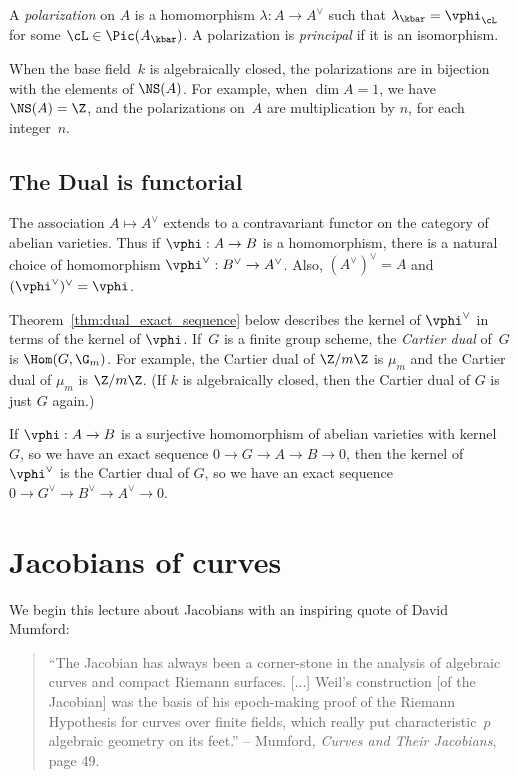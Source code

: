 \documentclass{report}
\begin{document}
\begin{definition}[Polarization]
A {\em polarization} on $A$ is a homomorphism $\lambda:A\to
A^{\vee}$ such that $\lambda_{\kbar} = \vphi_{\cL}$ for some
$\cL\in\Pic(A_{\kbar})$.  A polarization is {\em principal} if it
is an isomorphism.
\end{definition}

When the base field~$k$ is algebraically closed, the polarizations
are in bijection with the elements of $\NS(A)$.  For example, when
$\dim A=1$, we have $\NS(A)=\Z$, and the polarizations on~$A$ are
multiplication by $n$, for each integer~$n$.

\subsection{The Dual is functorial}
The association $A\mapsto A^{\vee}$ extends to a contravariant
functor on the category of abelian varieties.  Thus if $\vphi:A\to
B$ is a homomorphism, there is a natural choice of homomorphism
$\vphi^{\vee}:B^{\vee}\to A^{\vee}$.  Also, $(A^{\vee})^{\vee}=A$
and $(\vphi^{\vee})^{\vee}=\vphi$.

Theorem~\ref{thm:dual_exact_sequence} below describes the kernel
of $\vphi^{\vee}$ in terms of the kernel of $\vphi$.  If~$G$ is a
finite group scheme, the {\em Cartier dual} of~$G$ is
$\Hom(G,\G_m)$.  For example, the Cartier dual of $\Z/m\Z$ is
$\mu_m$ and the Cartier dual of $\mu_m$ is $\Z/m\Z$.  (If $k$ is
algebraically closed, then the Cartier dual of $G$ is just $G$
again.)

\begin{theorem}\label{thm:dual_exact_sequence}
If $\vphi:A\to B$ is a surjective homomorphism of abelian
varieties with kernel~$G$, so we have an exact sequence $0\to G
\to A\to B\to 0$, then the kernel of $\vphi^{\vee}$ is the Cartier
dual of $G$, so we have an exact sequence $0\to G^{\vee}\to
B^{\vee}\to A^{\vee}\to 0$.
\end{theorem}

\section{Jacobians of curves}
We begin this lecture about Jacobians with an inspiring quote of David
Mumford:
\begin{quote}
``The Jacobian has always been a corner-stone in the analysis of
algebraic curves and compact Riemann surfaces. [...] Weil's
construction [of the Jacobian] was the basis of his epoch-making
proof of the Riemann Hypothesis for curves over finite fields,
which really put characteristic~$p$ algebraic geometry on its
feet.''  -- Mumford, \emph{Curves and Their Jacobians}, page 49.%
\end{quote}
\end{document}
